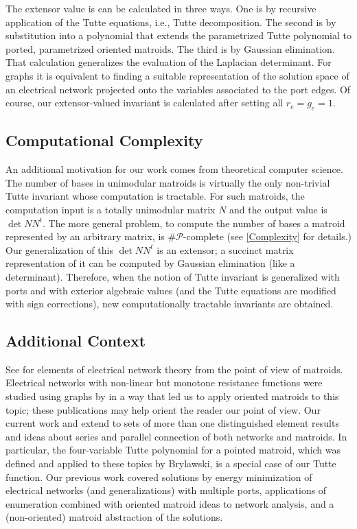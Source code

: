 \documentclass[12pt]{article}
\theoremstyle{definition}
\begin{document}
The extensor value is can be calculated in three ways.  
One is by recursive application of the Tutte equations, i.e., 
Tutte decomposition.  The second is
by substitution into a polynomial that extends the parametrized
Tutte polynomial to ported, parametrized oriented matroids.  
The third is by Gaussian elimination.  
That calculation 
generalizes the evaluation of the Laplacian
determinant.  For graphs it is equivalent to finding a suitable
representation of the solution space of an electrical network
projected onto the variables associated to the port edges.
Of course, our extensor-valued invariant is calculated after setting
all $r_e=g_e=1$.


\subsection{Computational Complexity}

An additional motivation for our work comes from theoretical computer
science.  The number of bases in unimodular matroids is virtually the
only non-trivial Tutte invariant whose computation is tractable.
For such matroids, the computation input is a totally unimodular 
matrix $N$ and the output value is $\det NN^{t}$.
The more general problem, to compute the number of bases a matroid represented
by an arbitrary matrix, is $\#\mathcal{P}$-complete
(see \textsection \ref{Complexity}
for details.)
Our generalization of this $\det NN^{t}$ is an extensor; a succinct
matrix representation of it can be computed by Gaussian elimination (like
a determinant).  Therefore, when the notion of Tutte invariant is
generalized with ports and with exterior algebraic values (and the 
Tutte equations are modified with sign corrections), new computationally 
tractable invariants are obtained.

\subsection{Additional Context}

See \cite{Recski,Murota} for elements of electrical 
network theory from the point of view of matroids.  Electrical networks
with non-linear but monotone resistance functions were studied using
graphs by\cite{HaslerNeirynck,HaslerDApplMath} in a way 
that led us to apply oriented matroids to this topic\cite{sdcOMP}; these
publications may help orient the reader our point of view.
Our current work and \cite{sdcPorted} extend to sets of
more than one distinguished element results and ideas about series and parallel
connection of both networks and matroids.  In particular, the
four-variable Tutte polynomial for a pointed matroid, which was
defined and applied to these topics by Brylawski\cite{BrylawskiPointed}, 
is a special case of our Tutte function.  Our previous
work covered solutions\cite{sdcELEW} by 
energy minimization\cite{LovaszEnergy} of electrical networks
(and generalizations) with multiple ports, applications of
enumeration\cite{sdcISCAS95} combined with oriented matroid
ideas\cite{sdcISCAS98} to network analysis, and a (non-oriented) matroid
abstraction\cite{sdcBDIMatroid} of the solutions.
\end{document}
